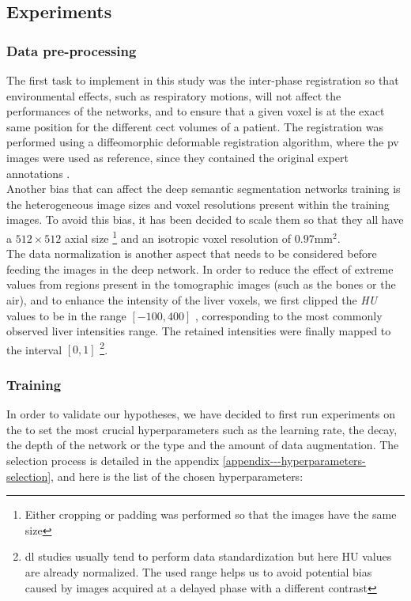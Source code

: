 \subsection{Experiments}

\subsubsection{Data pre-processing}

The first task to implement in this study was the inter-phase
registration so that environmental effects, such as respiratory motions,
will not affect the performances of the networks, and to ensure that a
given voxel is at the exact same position for the different \ac{cect}
volumes of a patient. The registration was performed using a
diffeomorphic deformable registration algorithm, where the \ac{pv}
images were used as reference, since they contained the original expert
annotations \cite{Avants2008, Conze2017, Ben-Cohen, Christ2017}. \\
Another bias that can affect the deep semantic segmentation networks
training is the heterogeneous image sizes and voxel resolutions present
within the training images.
To avoid this bias, it has been decided to scale them so that they all
have a $ 512\times512 $ axial size \footnote{Either cropping or padding was performed so that the images have the same size} and an isotropic voxel resolution of $ 0.97 \text{mm}^2 $. \\
The data normalization is another aspect that needs to be considered
before feeding the images in the deep network. In order to reduce the
effect of extreme values from regions present in the tomographic images
(such as the bones or the air), and to enhance the intensity of the
liver voxels, we first clipped the \emph{HU} values to be in the range
$ \left[-100, 400\right] $ , corresponding to the most commonly 
observed liver intensities range. The retained intensities were finally mapped to
the interval $ \left[0, 1\right]$ \footnote{\ac{dl} studies usually tend to perform 
data standardization but here HU values are already normalized. 
The used range helps us to avoid potential bias caused by images acquired at a delayed phase with a different contrast}.

\subsubsection{Training}\label{sem-seg-training}

In order to validate our hypotheses, we have decided to first run
experiments on the  to set the most crucial hyperparameters
such as the learning rate, the decay, the depth of the network or the
type and the amount of data augmentation.
The selection process is detailed in the appendix \ref{appendix---hyperparameters-selection}, and here is the list of the chosen hyperparameters:


